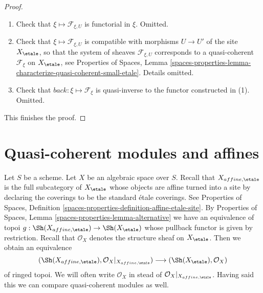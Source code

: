 \begin{proof}
\begin{enumerate}
\item Check that $\xi \mapsto \mathcal{F}_{\xi, U}$ is functorial in $\xi$.
Omitted.
\item Check that $\xi \mapsto \mathcal{F}_{\xi, U}$ is compatible
with morphisms $U \to U'$ of the site $X_\etale$, so that
the system of sheaves $\mathcal{F}_{\xi, U}$ corresponds to a quasi-coherent
$\mathcal{F}_\xi$ on $X_\etale$, see
Properties of Spaces,
Lemma \ref{spaces-properties-lemma-characterize-quasi-coherent-small-etale}.
Details omitted.
\item Check that $back : \xi \mapsto \mathcal{F}_\xi$ is quasi-inverse
to the functor constructed in (1). Omitted.
\end{enumerate}
This finishes the proof.
\end{proof}









\section{Quasi-coherent modules and affines}
\label{section-alternative-quasi-coherent}

\noindent
Let $S$ be a scheme. Let $X$ be an algebraic space over $S$.
Recall that $X_{affine, \etale}$ is the full subcategory of $X_\etale$
whose objects are affine turned into a site by declaring the coverings
to be the standard \'etale coverings. See Properties of Spaces, Definition
\ref{spaces-properties-definition-affine-etale-site}.
By Properties of Spaces, Lemma \ref{spaces-properties-lemma-alternative}
we have an equivalence of topoi
$g : \Sh(X_{affine, \etale}) \to \Sh(X_\etale)$
whose pullback functor is given by restriction.
Recall that $\mathcal{O}_X$ denotes the structure sheaf on
$X_\etale$. Then we obtain an equivalence
\begin{equation}
\label{equation-alternative-small-ringed}
(\Sh(X_{affine, \etale}), \mathcal{O}_X|_{X_{affine, \etale}})
\longrightarrow
(\Sh(X_\etale), \mathcal{O}_X)
\end{equation}
of ringed topoi. We will often write $\mathcal{O}_X$
in stead of $\mathcal{O}_X|_{X_{affine, \etale}}$.
Having said this we can compare quasi-coherent modules as well.

